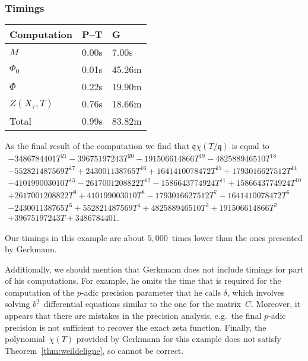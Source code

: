 \documentclass[a4paper,11pt]{article}
\numberwithin{equation}{section}
\theoremstyle{definition}
\begin{document}
\subsubsection{Timings}

\begin{center}
\begin{tabular}{l l l} \toprule
Computation     & P--T & G      \\ \midrule
$M$             & 0.00s& 7.00s      \\
$\Phi_0$        & 0.01s& 45.26m \\
$\Phi$          & 0.22s& 19.90m \\
$Z(X_{\tau},T)$ & 0.76s& 18.66m \\
Total           & 0.99s& 83.82m \\ \bottomrule
\end{tabular}
\end{center}

As the final result of the computation we find that 
$\mathfrak{q} \chi(T/\mathfrak{q})$ is equal to 
\begin{multline*}
- 3486784401T^{21} - 39675197243T^{20} - 191506614866T^{19} - 482588946510T^{18} \\
- 552821487569T^{17} + 243001138765T^{16} + 1641410078472T^{15} + 1793016627512T^{14} \\
- 410199003010T^{13} - 2617001208822T^{12} - 1586643774924T^{11} + 1586643774924T^{10} \\
+ 2617001208822T^9 + 410199003010T^8 - 1793016627512T^7 - 1641410078472T^6 \\
- 243001138765T^5+ 552821487569T^4 + 482588946510T^3 + 191506614866T^2 \\
+ 39675197243T + 3486784401.
\end{multline*}

Our timings in this example are about $5,000$~times lower than the ones 
presented by Gerkmann. 

Additionally, we should mention that Gerkmann does not include timings for part 
of his computations.  For example, he omits the time that is required for the 
computation of the $p$-adic precision parameter that he calls $\delta$, which 
involves solving $b^2$~differential equations similar to the one for the matrix~$C$. 
Moreover, it appears that there are mistakes in the precision analysis, e.g.\ 
the final $p$-adic precision is not sufficient to recover the exact zeta function. 
Finally, the polynomial~$\chi(T)$ provided by Gerkmann for this example does 
not satisfy Theorem~\ref{thm:weildeligne}, so cannot be correct.
\end{document}
